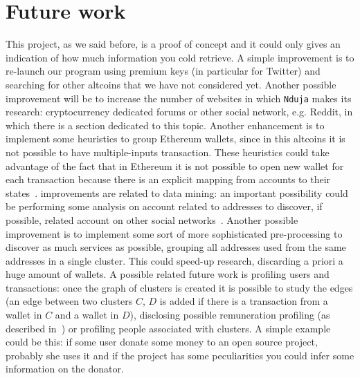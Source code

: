 \section{Future work} \label{future}
This project, as we said before, is a proof of concept and it could only gives
an indication of how much information you cold retrieve. A simple improvement
is to re-launch our program using premium keys (in particular for Twitter) and
searching for other altcoins that we have not considered yet. Another possible
improvement will be to increase the number of websites in which \texttt{Nduja}
makes its research: cryptocurrency dedicated forums or other social network,
e.g. Reddit, in which there is a section dedicated to this topic. Another
enhancement is to implement some heuristics to group Ethereum wallets, since in
this altcoins it is not possible to have multiple-inputs transaction. These
heuristics could take advantage of the fact that in Ethereum it is
not possible to open new wallet for each transaction because there is an
explicit mapping from accounts to their states~\cite{bib:ethersok}.
improvements are related to data mining: an important possibility could be
performing some analysis on account related to addresses to discover, if
possible, related account on other social networks~\cite{bib:osinference}.
Another possible improvement is to implement some sort of more sophisticated
pre-processing to discover as much services as possible, grouping all addresses
used from the same addresses in a single cluster. This could speed-up research,
discarding a priori a huge amount of wallets. A possible related future work is
profiling users and transactions: once the graph of clusters is created it is
possible to study the edges (an edge between two clusters $C$, $D$ is added
if there is a transaction from a wallet in $C$ and a wallet in $D$), disclosing
possible remuneration profiling (as described in~\cite{bib:fullDiscl}) or
profiling people associated with clusters. A simple example could be this: if
some user donate some money to an open source project, probably she uses it and
if the project has some peculiarities you could infer some information on the
donator.